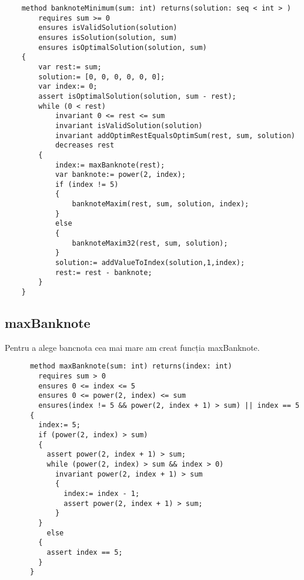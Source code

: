     \begin{lstlisting}
    method banknoteMinimum(sum: int) returns(solution: seq < int > )
        requires sum >= 0
        ensures isValidSolution(solution)
        ensures isSolution(solution, sum)
        ensures isOptimalSolution(solution, sum) 
    {
        var rest:= sum;
        solution:= [0, 0, 0, 0, 0, 0];
        var index:= 0;
        assert isOptimalSolution(solution, sum - rest);
        while (0 < rest)
            invariant 0 <= rest <= sum
            invariant isValidSolution(solution)
            invariant addOptimRestEqualsOptimSum(rest, sum, solution)
            decreases rest 
        {
            index:= maxBanknote(rest);
            var banknote:= power(2, index);
            if (index != 5) 
            {
                banknoteMaxim(rest, sum, solution, index);
            } 
            else 
            {
                banknoteMaxim32(rest, sum, solution);
            }
            solution:= addValueToIndex(solution,1,index);
            rest:= rest - banknote;
        }
    }
    \end{lstlisting}

    \subsection{maxBanknote}
    Pentru a alege bancnota cea mai mare am creat funcția maxBanknote.\par
    \begin{lstlisting}
      method maxBanknote(sum: int) returns(index: int)
        requires sum > 0
        ensures 0 <= index <= 5
        ensures 0 <= power(2, index) <= sum
        ensures(index != 5 && power(2, index + 1) > sum) || index == 5 
      {
        index:= 5;
        if (power(2, index) > sum) 
        {
          assert power(2, index + 1) > sum;
          while (power(2, index) > sum && index > 0)
            invariant power(2, index + 1) > sum 
            {
              index:= index - 1;
              assert power(2, index + 1) > sum;
            }
        } 
          else 
        {
          assert index == 5;
        }
      }
    \end{lstlisting}


